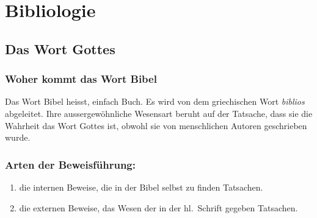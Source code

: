 \chapter{Bibliologie}
\section{Das Wort Gottes}
\subsection {Woher kommt das Wort Bibel}
Das Wort Bibel heisst, einfach Buch. Es wird von dem griechischen Wort \textit{biblios} abgeleitet. Ihre aussergewöhnliche Wesensart beruht auf der Tatsache, dass sie die Wahrheit das Wort Gottes ist, obwohl sie von menschlichen Autoren geschrieben wurde.\\

\subsection{Arten der Beweisführung:}
\begin{enumerate}
	\item die internen Beweise, die in der Bibel selbst zu finden Tatsachen.
	\item die externen Beweise, das Wesen der in der hl.\ Schrift gegeben Tatsachen.
\end{enumerate}


